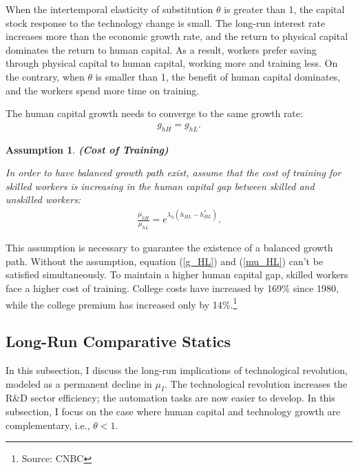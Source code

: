 \documentclass[12pt]{article}
\newtheorem{assumption}{Assumption}
\begin{document}
When the intertemporal elasticity of substitution $\theta$ is greater than 1, the capital stock response to the technology change is small. The long-run interest rate increases more than the economic growth rate, and the return to physical capital dominates the return to human capital. As a result, workers prefer saving through physical capital to human capital, working more and training less. On the contrary, when $\theta$ is smaller than 1, the benefit of human capital dominates, and the workers spend more time on training. 

The human capital growth needs to converge to the same growth rate: 
\begin{align}
\label{g_HL}
g_{hH} = g_{hL}.
\end{align}

\begin{assumption}{\bf (Cost of Training)}

In order to have balanced growth path exist, assume that the cost of training for skilled workers is increasing in the human capital gap between skilled and unskilled workers: 
\begin{align}
\label{mu_HL}
\frac{\mu_{hH}}{\mu_{hL}} = e^{\lambda_h(h_{HL}-h_{HL}^*)}.
\end{align}
\end{assumption}

This assumption is necessary to guarantee the existence of a balanced growth path. Without the assumption, equation (\ref{g_HL}) and (\ref{mu_HL}) can't be satisfied simultaneously. To maintain a higher human capital gap, skilled workers face a higher cost of training. College costs have increased by 169\% since 1980, while the college premium has increased only by 14\%.\footnote{Source: CNBC}


\subsection{Long-Run Comparative Statics}
In this subsection, I discuss the long-run implications of technological revolution, modeled as a permanent decline in $\mu_I$. The technological revolution increases the R\&D sector efficiency; the automation tasks are now easier to develop. In this subsection, I focus on the case where human capital and technology growth are complementary, i.e., $\theta<1$. 
\end{document}
